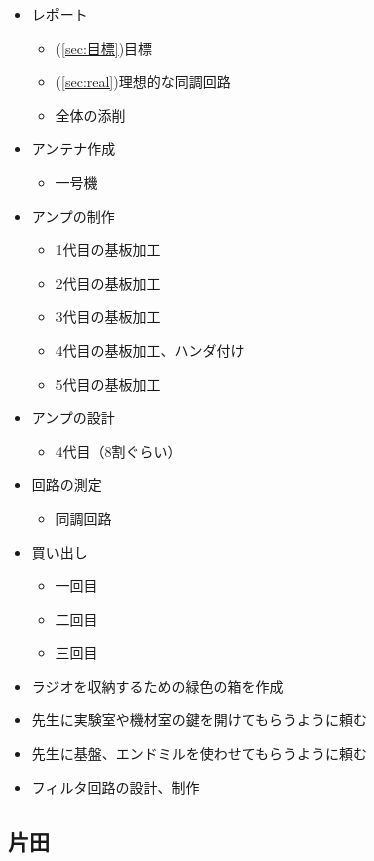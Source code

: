 \documentclass[report.tex]{subfiles}
\begin{document}
\begin{itemize}
	\item レポート
	      \begin{itemize}
		      \item (\ref{sec:目標})目標
		      \item (\ref{sec:real})理想的な同調回路
		      \item 全体の添削
	      \end{itemize}
	\item アンテナ作成
	      \begin{itemize}
		      \item 一号機
	      \end{itemize}
	\item アンプの制作
	      \begin{itemize}
		      \item 1代目の基板加工
		      \item 2代目の基板加工
		      \item 3代目の基板加工
		      \item 4代目の基板加工、ハンダ付け
		      \item 5代目の基板加工
	      \end{itemize}
	\item アンプの設計
	      \begin{itemize}
		      \item 4代目（8割ぐらい）
	      \end{itemize}
	\item 回路の測定
	      \begin{itemize}
		      \item 同調回路
	      \end{itemize}
	\item 買い出し
	      \begin{itemize}
		      \item 一回目
		      \item 二回目
		      \item 三回目
	      \end{itemize}
	\item ラジオを収納するための緑色の箱を作成
	\item 先生に実験室や機材室の鍵を開けてもらうように頼む
	\item 先生に基盤、エンドミルを使わせてもらうように頼む
	\item フィルタ回路の設計、制作
\end{itemize}

\subsection{片田}
\end{document}
